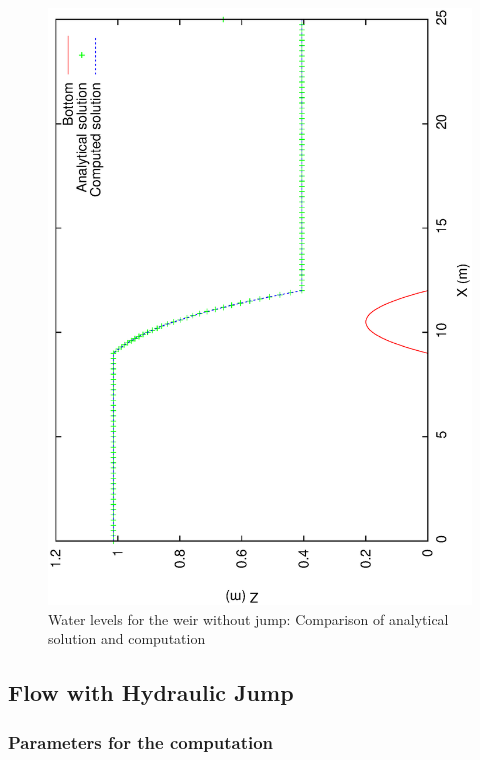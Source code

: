 \documentclass[a4paper,12pt]{article}
\begin{document}
\begin{figure}[h]
  \begin{center}
  \includegraphics[scale=0.5,angle=-90]{Zsanschoc}
  \caption{Water levels for the weir without jump: Comparison of analytical solution and computation}
  \label{fig:level-weir-wo-jump}
  \end{center}
\end{figure}



\subsection{Flow with Hydraulic Jump}

\subsubsection{Parameters for the computation}
\end{document}
